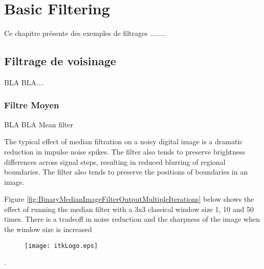 \chapter{Basic Filtering}

Ce chapitre pr\'{e}sente des exemples de filtrages ........


\section{Filtrage de voisinage}
\label{sec:NeighborhoodFilters}

BLA BLA....


\subsection{Filtre Moyen}
\label{sec:MeanFilter}

\ifitkFullVersion

\fi

BLA BLA Mean filter


The typical effect of median filtration on a noisy digital image is a dramatic reduction in impulse noise spikes. The filter also tends to preserve brightness differences across signal steps, resulting in reduced blurring of regional boundaries. The filter also tends to preserve the positions of boundaries in an image.

Figure \ref{fig:BinaryMedianImageFilterOutputMultipleIterations} below shows the effect of running the median filter with a 3x3 classical window size 
1, 10 and 50 times. There is a tradeoff in noise reduction and the sharpness of the image when the window size is increased\begin{figure}
  \center
  \texttt{[image: itkLogo.eps]}
  \label{fig:itkLogo}
\end{figure}.



